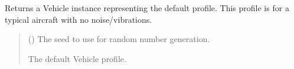 \documentclass[letterpaper,10pt,english]{sphinxmanual}
\begin{document}
\begin{fulllineitems}
\label{\detokenize{modules/waypoints/vehicle:qnav.waypoints.vehicle.get_default_profile}}
\pysigstartsignatures
{}
\pysigstopsignatures
\sphinxAtStartPar
Returns a Vehicle instance representing the default profile.
This profile is for a typical aircraft with no noise/vibrations.
\begin{quote}\begin{description}
\sphinxAtStartPar
{} () \textendash{} The seed to use for random number generation.

\sphinxAtStartPar
The default Vehicle profile.

\sphinxAtStartPar
{\hyperref[\detokenize{modules/waypoints/vehicle:qnav.waypoints.vehicle.Vehicle}]{}}

\end{description}\end{quote}

\end{fulllineitems}

\end{document}
